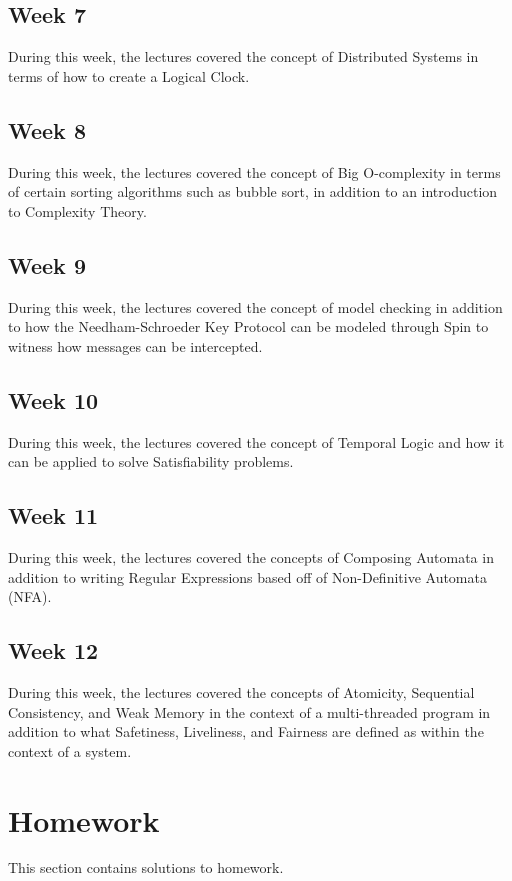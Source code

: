 \documentclass{article}
\theoremstyle{theorem}
\theoremstyle{definition}
\theoremstyle{remark}
\begin{document}
\subsection{Week 7} During this week, the lectures covered the concept of Distributed Systems in terms of how to create a Logical Clock.
\subsection{Week 8} During this week, the lectures covered the concept of Big O-complexity in terms of certain sorting algorithms such as bubble sort, in addition to an introduction to Complexity Theory.
\subsection{Week 9} During this week, the lectures covered the concept of model checking in addition to how the Needham-Schroeder Key Protocol can be modeled through Spin to witness how messages can be intercepted.
\subsection{Week 10} During this week, the lectures covered the concept of Temporal Logic and how it can be applied to solve Satisfiability problems.
\subsection{Week 11} During this week, the lectures covered the concepts of Composing Automata in addition to writing Regular Expressions based off of Non-Definitive Automata (NFA).
\subsection{Week 12} During this week, the lectures covered the concepts of Atomicity, Sequential Consistency, and Weak Memory in the context of a multi-threaded program in addition to what Safetiness, Liveliness, and Fairness are defined as within the context of a system.
\section{Homework}\label{homework}

This section contains solutions to homework. 
\end{document}
